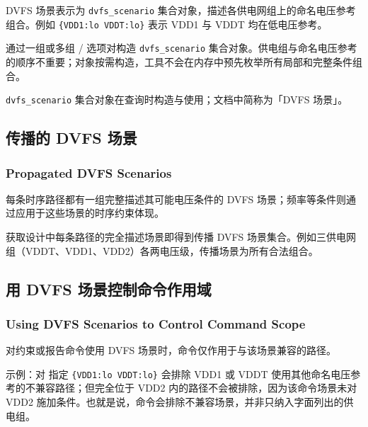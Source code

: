 DVFS 场景表示为 \texttt{dvfs\_scenario} 集合对象，描述各供电网组上的命名电压参考组合。例如 \texttt{\{VDD1:lo VDDT:lo\}} 表示 VDD1 与 VDDT 均在低电压参考。

 通过一组或多组 / 选项对构造 \texttt{dvfs\_scenario} 集合对象。供电组与命名电压参考的顺序不重要；对象按需构造，工具不会在内存中预先枚举所有局部和完整条件组合。

\begin{noteBox}
\texttt{dvfs\_scenario} 集合对象在查询时构造与使用；文档中简称为「DVFS 场景」。
\end{noteBox}

\subsection{传播的 DVFS 场景}
\subsubsection*{Propagated DVFS Scenarios}

每条时序路径都有一组完整描述其可能电压条件的 DVFS 场景；频率等条件则通过应用于这些场景的时序约束体现。



获取设计中每条路径的完全描述场景即得到传播 DVFS 场景集合。例如三供电网组（VDDT、VDD1、VDD2）各两电压级，传播场景为所有合法组合。

\subsection{用 DVFS 场景控制命令作用域}
\subsubsection*{Using DVFS Scenarios to Control Command Scope}

对约束或报告命令使用 DVFS 场景时，命令仅作用于与该场景兼容的路径。


示例：对  指定 \texttt{\{VDD1:lo VDDT:lo\}} 会排除 VDD1 或 VDDT 使用其他命名电压参考的不兼容路径；但完全位于 VDD2 内的路径不会被排除，因为该命令场景未对 VDD2 施加条件。也就是说，命令会排除不兼容场景，并非只纳入字面列出的供电组。

